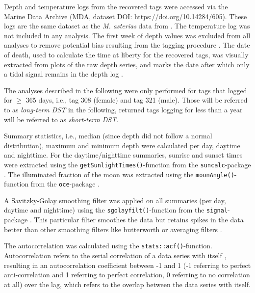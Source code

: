 \documentclass[
  authoryear,
  review,
  3p]{elsarticle}
\begin{document}
Depth and temperature logs from the recovered tags were accessed via the
Marine Data Archive (MDA, dataset DOI: https://doi.org/10.14284/605).
These logs are the same dataset as the \emph{M. asterias} data from
\citet{goossens_2023}. The temperature log was not included in any
analysis. The first week of depth values was excluded from all analyses
to remove potential bias resulting from the tagging procedure
\citep[following][]{flavio_2021}. The date of death, used to calculate
the time at liberty for the recovered tags, was visually extracted from
plots of the raw depth series, and marks the date after which only a
tidal signal remains in the depth log \citep[characterised by cyclically
rising and falling depths within a rough 2 m depth
range,][]{kvale_2006}.

The analyses described in the following were only performed for tags
that logged for \(\geq\) 365 days, i.e., tag 308 (female) and tag 321
(male). Those will be referred to as \emph{long-term DST} in the
following, returned tags logging for less than a year will be referred
to as \emph{short-term DST}.

Summary statistics, i.e., median (since depth did not follow a normal
distribution), maximum and minimum depth were calculated per day,
daytime and nighttime. For the daytime/nighttime summaries, sunrise and
sunset times were extracted using the
\texttt{getSunlightTimes()}-function from the \texttt{suncalc}-package
\citep{suncalc}. The illuminated fraction of the moon was extracted
using the \texttt{moonAngle()}-function from the \texttt{oce}-package
\citep{oce}.

A Savitzky-Golay smoothing filter \citep[ filter order \emph{p = 1},
filter length \emph{n = 5}]{press_1990} was applied on all summaries
(per day, daytime and nighttime) using the
\texttt{sgolayfilt()}-function from the \texttt{signal}-package
\citep{signal}. This particular filter smoothes the data but retains
spikes in the data better than other smoothing filters like butterworth
or averaging filters \citep[such as a rolling mean,][]{schafer_2011}.

The autocorrelation was calculated using the
\texttt{stats::acf()}-function. Autocorrelation refers to the serial
correlation of a data series with itself \citep{bartlett_1946},
resulting in an autocorrelation coefficient between -1 and 1 (-1
referring to perfect anti-correlation and 1 referring to perfect
correlation, 0 referring to no correlation at all) over the lag, which
refers to the overlap between the data series with itself.
\end{document}

